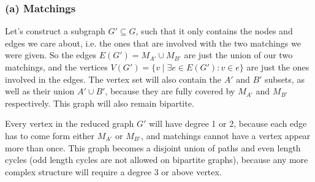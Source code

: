 \documentclass{article}
\begin{document}
  \subsubsection*{(a) Matchings}


  Let's construct a subgraph $G' \subseteq G$, such that it only contains the nodes and edges we care about,
  i.e. the ones that are involved with the two matchings we were given.
  So the edges $E(G') = M_{A'} \cup M_{B'}$ are just the union of our two matchings,
  and the vertices $V(G') = \{v \mid \exists e \in E(G') : v \in e \} $ are just the ones involved in the edges.
  The vertex set will also contain the $A'$ and $B'$ subsets, as well as their union $A' \cup B'$,
  because they are fully covered by $M_{A'}$ and $M_{B'}$ respectively.
  This graph will also remain bipartite.

  Every vertex in the reduced graph $G'$ will have degree 1 or 2, because each edge has to come form either $M_{A'}$ or $M_{B'}$,
  and matchings cannot have a vertex appear more than once.
  This graph becomes a disjoint union of paths and even length cycles (odd length cycles are not allowed on bipartite graphs),
  because any more complex structure will require a degree 3 or above vertex.
\end{document}
